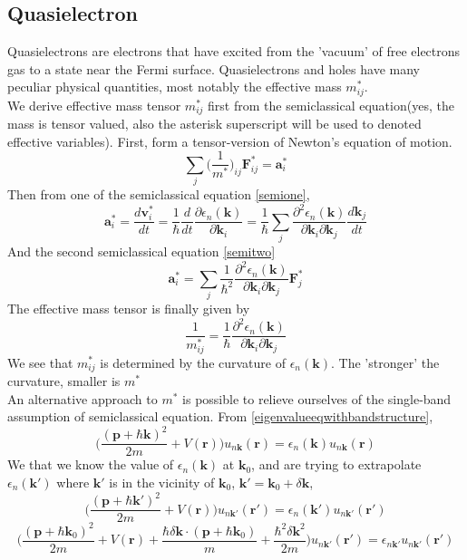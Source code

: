 \documentclass{article}
\begin{document}
\subsection*{Quasielectron}
Quasielectrons are electrons that have excited from the 'vacuum' of free electrons gas to a state near the Fermi surface. Quasielectrons and holes have many peculiar physical quantities, most notably the effective mass $m^*_{ij}$.\\
We derive effective mass tensor $m^*_{ij}$ first from the semiclassical equation(yes, the mass is tensor valued, also the asterisk superscript will be used to denoted effective variables). First, form a tensor-version of Newton's equation of motion.
$$\sum_j\Biggl(\frac{1}{m^*}\Biggr)_{ij}\mathbf{F}^*_{ij}=\mathbf{a}_{i}^{*}$$
Then from one of the semiclassical equation \eqref{semione},
$$\mathbf{a}_{i}^{*}=\frac{d\mathbf{v}_{i}^{*}}{dt}=\frac{1}{\hbar}\frac{d}{dt}\frac{\partial \epsilon_n(\mathbf{k})}{\partial\mathbf{k}_i}=\frac{1}{\hbar}\sum_j\frac{\partial^2 \epsilon_n(\mathbf{k})}{\partial\mathbf{k}_i\partial\mathbf{k}_j}\frac{d\mathbf{k}_j}{dt}$$
And the second semiclassical equation \eqref{semitwo}
$$\mathbf{a}_{i}^{*}=\sum_j\frac{1}{\hbar^2}\frac{\partial^2 \epsilon_n(\mathbf{k})}{\partial\mathbf{k}_i\partial\mathbf{k}_j}\mathbf{F}_j^*$$
The effective mass tensor is finally given by
$$\frac{1}{m_{ij}^{*}}=\frac{1}{\hbar}\frac{\partial^2 \epsilon_n(\mathbf{k})}{\partial\mathbf{k}_i\partial\mathbf{k}_j}$$
We see that $m_{ij}^{*}$ is determined by the curvature of $\epsilon_n(\mathbf{k})$. The 'stronger' the curvature, smaller is $m^*$\\
An alternative approach to $m^*$ is possible to relieve ourselves of the single-band assumption of semiclassical equation. From \eqref{eigenvalueeqwithbandstructure},
$$\Biggl(\frac{(\mathbf{p}+\hbar\mathbf{k})^2}{2m}+V(\mathbf{r})\Biggr)u_{n\mathbf{k}}(\mathbf{r})=\epsilon_n(\mathbf{k})u_{n\mathbf{k}}(\mathbf{r})$$
We that we know the value of $\epsilon_n(\mathbf{k})$ at $\mathbf{k}_0$, and are trying to extrapolate $\epsilon_n(\mathbf{k}')$ where $\mathbf{k}'$ is in the vicinity of $\mathbf{k}_0$, $\mathbf{k}'=\mathbf{k}_0+\delta\mathbf{k}$,
$$\Biggl(\frac{(\mathbf{p}+\hbar\mathbf{k}')^2}{2m}+V(\mathbf{r})\Biggr)u_{n\mathbf{k}'}(\mathbf{r}')=\epsilon_n(\mathbf{k}')u_{n\mathbf{k}'}(\mathbf{r}')$$
$$\Biggl(\frac{(\mathbf{p}+\hbar\mathbf{k}_0)^2}{2m}+V(\mathbf{r})+\frac{\hbar\delta\mathbf{k}\cdot(\mathbf{p}+\hbar\mathbf{k}_0)}{m}+\frac{\hbar^2\delta\mathbf{k}^2}{2m}\Biggr)u_{n\mathbf{k}'}(\mathbf{r}')=\epsilon_{n\mathbf{k}'}u_{n\mathbf{k}'}(\mathbf{r}')$$
\end{document}

